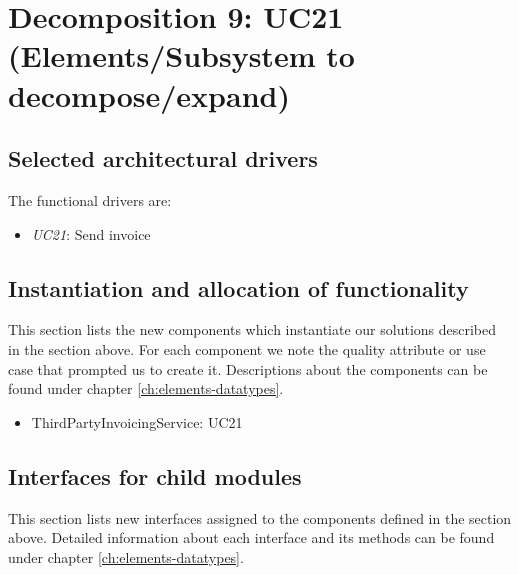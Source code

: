 \section{Decomposition 9: UC21 (Elements/Subsystem to decompose/expand)}


\subsection*{Selected architectural drivers}
    The functional drivers are:
    \begin{itemize}
        \item \emph{UC21}: Send invoice
    \end{itemize}


\subsection*{Instantiation and allocation of functionality}
    This section lists the new components which instantiate our solutions
    described in the section above. For each component we note the quality
    attribute or use case that prompted us to create it. Descriptions about
    the components can be found under chapter \ref{ch:elements-datatypes}. \\

    \begin{itemize}
        \item ThirdPartyInvoicingService: UC21
    \end{itemize}


\subsection*{Interfaces for child modules}
    This section lists new interfaces assigned to the components defined
    in the section above. Detailed information about each interface and
    its methods can be found under chapter \ref{ch:elements-datatypes}.

